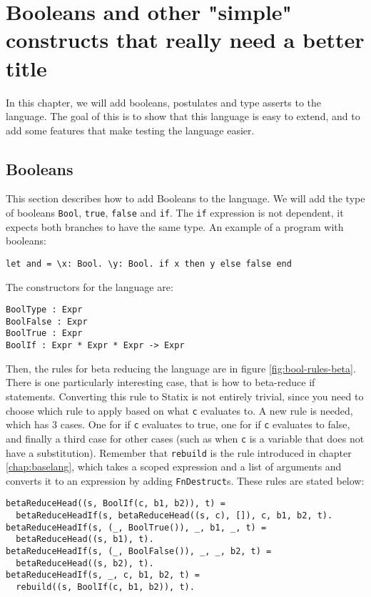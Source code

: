 \chapter{\label{chap:bools}Booleans and other "simple" constructs that really need a better title}

In this chapter, we will add booleans, postulates and type asserts to the language. The goal of this is to show that this language is easy to extend, and to add some features that make testing the language easier.

\section{Booleans}

This section describes how to add Booleans to the language. We will add the type of booleans \verb|Bool|, \verb|true|, \verb|false| and \verb|if|. The \verb|if| expression is not dependent, it expects both branches to have the same type. An example of a program with booleans: 

\begin{lstlisting}
let and = \x: Bool. \y: Bool. if x then y else false end
\end{lstlisting}
The constructors for the language are:

\begin{lstlisting}
BoolType : Expr
BoolFalse : Expr
BoolTrue : Expr
BoolIf : Expr * Expr * Expr -> Expr
\end{lstlisting}
Then, the rules for beta reducing the language are in figure \ref{fig:bool-rules-beta}. There is one particularly interesting case, that is how to beta-reduce if statements. Converting this rule to Statix is not entirely trivial, since you need to choose which rule to apply based on what \verb|c| evaluates to. A new rule is needed, which has 3 cases. One for if \verb|c| evaluates to true, one for if \verb|c| evaluates to false, and finally a third case for other cases (such as when \verb|c| is a variable that does not have a substitution). Remember that \verb|rebuild| is the rule introduced in chapter \ref{chap:baselang}, which takes a scoped expression and a list of arguments and converts it to an expression by adding \verb|FnDestruct|s. These rules are stated below:

\begin{lstlisting}
betaReduceHead((s, BoolIf(c, b1, b2)), t) = 
  betaReduceHeadIf(s, betaReduceHead((s, c), []), c, b1, b2, t).
betaReduceHeadIf(s, (_, BoolTrue()), _, b1, _, t) = 
  betaReduceHead((s, b1), t).
betaReduceHeadIf(s, (_, BoolFalse()), _, _, b2, t) = 
  betaReduceHead((s, b2), t).
betaReduceHeadIf(s, _, c, b1, b2, t) = 
  rebuild((s, BoolIf(c, b1, b2)), t).
\end{lstlisting}


